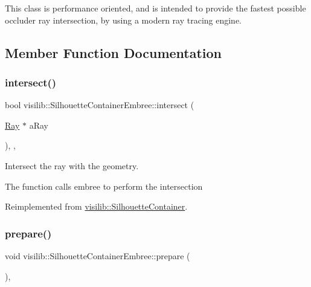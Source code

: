 This class is performance oriented, and is intended to provide the fastest possible occluder ray intersection, by using a modern ray tracing engine. 

\subsection{Member Function Documentation}
\mbox{\label{classvisilib_1_1_silhouette_container_embree_a3a7290096b31163d775b11a356b7d3e0}} 
\subsubsection{\texorpdfstring{intersect()}{intersect()}}
{\footnotesize\ttfamily bool visilib\+::\+Silhouette\+Container\+Embree\+::intersect (\begin{DoxyParamCaption}\item[{\mbox{\hyperlink{structvisilib_1_1_ray}{Ray}} $\ast$}]{a\+Ray }\end{DoxyParamCaption})\hspace{0.3cm}{\ttfamily [inline]}, {\ttfamily [override]}, {\ttfamily [virtual]}}



Intersect the ray with the geometry. 

The function calls embree to perform the intersection 

Reimplemented from \mbox{\hyperlink{classvisilib_1_1_silhouette_container}{visilib\+::\+Silhouette\+Container}}.

\mbox{\label{classvisilib_1_1_silhouette_container_embree_ad3d6193f5484b3fb56096efd8a1230a8}} 
\subsubsection{\texorpdfstring{prepare()}{prepare()}}
{\footnotesize\ttfamily void visilib\+::\+Silhouette\+Container\+Embree\+::prepare (\begin{DoxyParamCaption}{ }\end{DoxyParamCaption})\hspace{0.3cm}{\ttfamily [inline]}, {\ttfamily [virtual]}}



